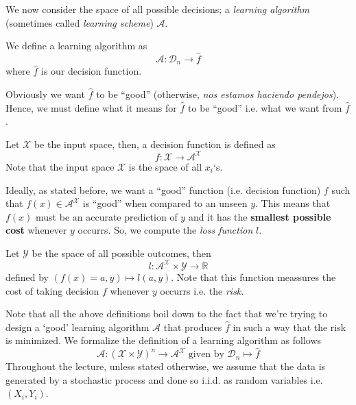 We now consider the space of all possible decisions; a \textit{learning algorithm }(sometimes called \textit{learning scheme}) $\mathscr{A}$. 

\begin{definition}
    We define a learning algorithm as $$\mathscr{A}: \mathcal{D}_n \rightarrow \hat{f}$$ where $\hat{f}$ is our decision function.
\end{definition}

Obviously we want $\hat{f}$ to be ``good'' (otherwise, \textit{nos estamos haciendo pendejos}). Hence, we must define what it means for $\hat{f}$ to be ``good'' i.e. what we want from $\hat{f}$. 

\begin{definition}
    Let $\mathcal{X}$ be the input space, then, a decision function is defined as $$f:\mathcal{X} \rightarrow \mathcal{A}^{\mathcal{X}}$$ Note that the input space $\mathcal{X}$ is the space of all $x_i$`s.
\end{definition}

Ideally, as stated before, we want a ``good'' function (i.e. decision function) $f$ such that $f(x) \in \mathcal{A}^{\mathcal{X}}$ is ``good'' when compared to an unseen $y$. This means that $f(x)$ must be an accurate prediction of $y$ and it has
the \textbf{smallest possible cost} whenever $y$ occurrs. So, we compute the \textit{loss function} $l$.

\begin{definition}
    Let $\mathcal{Y}$ be the space of all possible outcomes, then $$l:\mathcal{A}^{\mathcal{X}} \times \mathcal{Y} \rightarrow \mathbb{R}$$ defined by $(f(x)=a,y) \mapsto l(a,y)$. Note that this function meassures the cost of taking decision $f$ whenever $y$ occurrs i.e. the \textit{risk}.
\end{definition}

\begin{remark}
    Note that all the above definitions boil down to the fact that we're trying to design a `good' learning algorithm $\mathscr{A}$ that produces $\hat{f}$ in such a way that the risk is minimized. We formalize the definition of a learning algorithm as follows
    $$\mathscr{A}: \left(\mathcal{X} \times \mathcal{Y} \right)^{n} \rightarrow \mathcal{A}^{\mathcal{X}} \text{ given by } \mathcal{D}_n \mapsto \hat{f}$$ Throughout the lecture, unless stated otherwise, we assume that the data is generated by a stochastic process and
    done so i.i.d. as random variables i.e. $(X_i, Y_i)$.
\end{remark}

